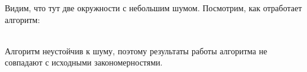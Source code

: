 Видим, что тут две окружности с небольшим шумом. Посмотрим, как отработает алгоритм: \\
\begin{figure}[h]
\end{figure} \\
Алгоритм неустойчив к шуму, поэтому результаты работы алгоритма не совпадают с исходными закономерностями. 

